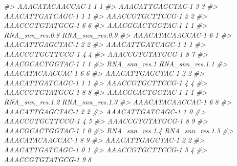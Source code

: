 \documentclass[
]{book}
\newenvironment{Shaded}{\begin{snugshade}}{\end{snugshade}}
\newcommand{\CommentTok}[1]{\textcolor[rgb]{0.56,0.35,0.01}{\textit{#1}}}
\begin{document}
\begin{Shaded}
\begin{Highlighting}[]
\CommentTok{\#\textgreater{} AAACATACAACCAC{-}1               1               1}
\CommentTok{\#\textgreater{} AAACATTGAGCTAC{-}1               3               3}
\CommentTok{\#\textgreater{} AAACATTGATCAGC{-}1               1               1}
\CommentTok{\#\textgreater{} AAACCGTGCTTCCG{-}1               2               2}
\CommentTok{\#\textgreater{} AAACCGTGTATGCG{-}1               6               6}
\CommentTok{\#\textgreater{} AAACGCACTGGTAC{-}1               1               1}
\CommentTok{\#\textgreater{}                  RNA\_snn\_res.0.8 RNA\_snn\_res.0.9}
\CommentTok{\#\textgreater{} AAACATACAACCAC{-}1               6               1}
\CommentTok{\#\textgreater{} AAACATTGAGCTAC{-}1               2               2}
\CommentTok{\#\textgreater{} AAACATTGATCAGC{-}1               1               1}
\CommentTok{\#\textgreater{} AAACCGTGCTTCCG{-}1               4               4}
\CommentTok{\#\textgreater{} AAACCGTGTATGCG{-}1               8               7}
\CommentTok{\#\textgreater{} AAACGCACTGGTAC{-}1               1               1}
\CommentTok{\#\textgreater{}                  RNA\_snn\_res.1 RNA\_snn\_res.1.1}
\CommentTok{\#\textgreater{} AAACATACAACCAC{-}1             6               6}
\CommentTok{\#\textgreater{} AAACATTGAGCTAC{-}1             2               2}
\CommentTok{\#\textgreater{} AAACATTGATCAGC{-}1             1               1}
\CommentTok{\#\textgreater{} AAACCGTGCTTCCG{-}1             4               4}
\CommentTok{\#\textgreater{} AAACCGTGTATGCG{-}1             8               8}
\CommentTok{\#\textgreater{} AAACGCACTGGTAC{-}1             1               1}
\CommentTok{\#\textgreater{}                  RNA\_snn\_res.1.2 RNA\_snn\_res.1.3}
\CommentTok{\#\textgreater{} AAACATACAACCAC{-}1               6               8}
\CommentTok{\#\textgreater{} AAACATTGAGCTAC{-}1               2               2}
\CommentTok{\#\textgreater{} AAACATTGATCAGC{-}1               1               0}
\CommentTok{\#\textgreater{} AAACCGTGCTTCCG{-}1               4               5}
\CommentTok{\#\textgreater{} AAACCGTGTATGCG{-}1               8               9}
\CommentTok{\#\textgreater{} AAACGCACTGGTAC{-}1               1               0}
\CommentTok{\#\textgreater{}                  RNA\_snn\_res.1.4 RNA\_snn\_res.1.5}
\CommentTok{\#\textgreater{} AAACATACAACCAC{-}1               8               9}
\CommentTok{\#\textgreater{} AAACATTGAGCTAC{-}1               2               2}
\CommentTok{\#\textgreater{} AAACATTGATCAGC{-}1               0               1}
\CommentTok{\#\textgreater{} AAACCGTGCTTCCG{-}1               5               4}
\CommentTok{\#\textgreater{} AAACCGTGTATGCG{-}1               9               8}

\end{Highlighting}
\end{Shaded}
\end{document}
